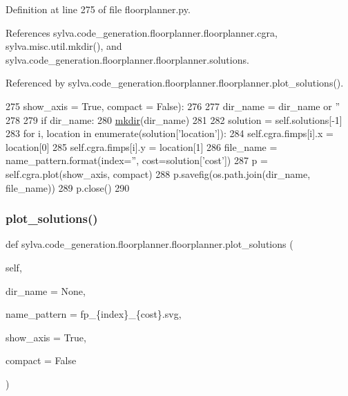 Definition at line 275 of file floorplanner.\+py.



References sylva.\+code\+\_\+generation.\+floorplanner.\+floorplanner.\+cgra, sylva.\+misc.\+util.\+mkdir(), and sylva.\+code\+\_\+generation.\+floorplanner.\+floorplanner.\+solutions.



Referenced by sylva.\+code\+\_\+generation.\+floorplanner.\+floorplanner.\+plot\+\_\+solutions().


\begin{DoxyCode}
275     show\_axis = \textcolor{keyword}{True}, compact = \textcolor{keyword}{False}):
276 
277     dir\_name = dir\_name \textcolor{keywordflow}{or} \textcolor{stringliteral}{''}
278 
279     \textcolor{keywordflow}{if} dir\_name:
280       \hyperlink{namespacesylva_1_1misc_1_1util_af426e429c40209bbb46e3a0e8f139a44}{mkdir}(dir\_name)
281 
282     solution = self.solutions[-1]
283     \textcolor{keywordflow}{for} i, location \textcolor{keywordflow}{in} enumerate(solution[\textcolor{stringliteral}{'location'}]):
284       self.cgra.fimps[i].x = location[0]
285       self.cgra.fimps[i].y = location[1]
286     file\_name = name\_pattern.format(index=\textcolor{stringliteral}{''}, cost=solution[\textcolor{stringliteral}{'cost'}])
287     p = self.cgra.plot(show\_axis, compact)
288     p.savefig(os.path.join(dir\_name, file\_name))
289     p.close()
290 
\end{DoxyCode}
\mbox{\label{classsylva_1_1code__generation_1_1floorplanner_1_1floorplanner_a9a77944b379401d7be62164312b29721}} 
\subsubsection{\texorpdfstring{plot\+\_\+solutions()}{plot\_solutions()}}
{\footnotesize\ttfamily def sylva.\+code\+\_\+generation.\+floorplanner.\+floorplanner.\+plot\+\_\+solutions (\begin{DoxyParamCaption}\item[{}]{self,  }\item[{}]{dir\+\_\+name = {\ttfamily None},  }\item[{}]{name\+\_\+pattern = {\ttfamily \textquotesingle{}fp\+\_\+\{index\}\+\_\+\{cost\}.svg\textquotesingle{}},  }\item[{}]{show\+\_\+axis = {\ttfamily True},  }\item[{}]{compact = {\ttfamily False} }\end{DoxyParamCaption})}



